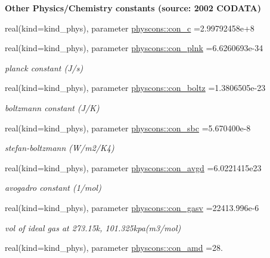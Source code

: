 \begin{Indent}{\bf Other Physics/\+Chemistry constants (source\+: 2002 C\+O\+D\+A\+TA)}\par
\begin{DoxyCompactItemize}
\item 
real(kind=kind\+\_\+phys), parameter \hyperlink{namespacephyscons_a5ea39e1c39e8ae07b8e76586452a9279}{physcons\+::con\+\_\+c} =2.\+99792458e+8
\item 
real(kind=kind\+\_\+phys), parameter \hyperlink{namespacephyscons_ac94d6814305be7f718a971f96ccb9f3f}{physcons\+::con\+\_\+plnk} =6.\+6260693e-\/34
\begin{DoxyCompactList}\small\item\em planck constant (J/s) \end{DoxyCompactList}\item 
real(kind=kind\+\_\+phys), parameter \hyperlink{namespacephyscons_a9c7c365685bc2319763e5bbe1300b852}{physcons\+::con\+\_\+boltz} =1.\+3806505e-\/23
\begin{DoxyCompactList}\small\item\em boltzmann constant (J/K) \end{DoxyCompactList}\item 
real(kind=kind\+\_\+phys), parameter \hyperlink{namespacephyscons_ad90a38d35e6d071f7679f6c0a6f6aee1}{physcons\+::con\+\_\+sbc} =5.\+670400e-\/8
\begin{DoxyCompactList}\small\item\em stefan-\/boltzmann (W/m2/\+K4) \end{DoxyCompactList}\item 
real(kind=kind\+\_\+phys), parameter \hyperlink{namespacephyscons_ab54a93783404e24a0392dac0e0efa6b5}{physcons\+::con\+\_\+avgd} =6.\+0221415e23
\begin{DoxyCompactList}\small\item\em avogadro constant (1/mol) \end{DoxyCompactList}\item 
real(kind=kind\+\_\+phys), parameter \hyperlink{namespacephyscons_a154e74ee27785d0568c18955cb21f6ac}{physcons\+::con\+\_\+gasv} =22413.\+996e-\/6
\begin{DoxyCompactList}\small\item\em vol of ideal gas at 273.\+15k, 101.\+325kpa(m3/mol) \end{DoxyCompactList}\item 
real(kind=kind\+\_\+phys), parameter \hyperlink{namespacephyscons_acb2960ad74b80b31da0bff4be5c2add3}{physcons\+::con\+\_\+amd} =28.

\end{DoxyCompactItemize}
\end{Indent}
